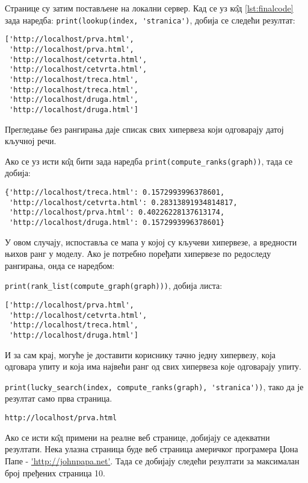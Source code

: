 Странице су затим постављене на локални сервер. Кад се уз к\^{о}д
\ref{lst:finalcode} зада наредба:
\lstinline{print(lookup(index, 'stranica')}, добија се следећи резултат:

\begin{lstlisting}
['http://localhost/prva.html',
 'http://localhost/prva.html',
 'http://localhost/cetvrta.html',
 'http://localhost/cetvrta.html',
 'http://localhost/treca.html',
 'http://localhost/treca.html',
 'http://localhost/druga.html',
 'http://localhost/druga.html']
\end{lstlisting}

Прегледање без рангирања даје списак свих хипервеза који одговарају датој
кључној речи.

Ако се уз исти к\^{о}д бити зада наредба
\lstinline{print(compute_ranks(graph))}, тада се добија:

\begin{lstlisting}
{'http://localhost/treca.html': 0.1572993996378601,
 'http://localhost/cetvrta.html': 0.28313891934814817,
 'http://localhost/prva.html': 0.40226228137613174,
 'http://localhost/druga.html': 0.1572993996378601}
\end{lstlisting}

У овом случају, испоставља се мапа у којој су кључеви хипервезе, а вредности
њихов ранг у моделу.
Ако је потребно поређати хипервезе по редоследу рангирања, онда се наредбом:

\lstinline{print(rank_list(compute_graph(graph)))}, добија листа:

\begin{lstlisting}
['http://localhost/prva.html',
 'http://localhost/cetvrta.html',
 'http://localhost/treca.html',
 'http://localhost/druga.html']
\end{lstlisting}

И за сам крај, могуће је доставити кориснику тачно једну хипервезу, која
одговара упиту и која има највећи ранг од свих хипервеза које одговарају упиту.

\lstinline{print(lucky_search(index, compute_ranks(graph), 'stranica'))},
тако да је резултат само прва страница.

\begin{lstlisting}
http://localhost/prva.html
\end{lstlisting}

Ако се исти к\^{о}д примени на реалне веб странице, добијају се адекватни
резултати. Нека улазна страница буде веб страница америчког програмера
Џона Папе - \url{'http://johnpapa.net'}. Тада се
добијају следећи резултати за максималан број пређених страница 10.

